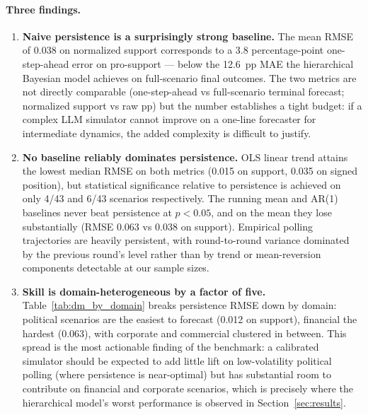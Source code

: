 \documentclass[12pt]{article}
\begin{document}
\paragraph{Three findings.}
\begin{enumerate}
    \item \textbf{Naive persistence is a surprisingly strong baseline.} The mean RMSE of 0.038 on normalized support corresponds to a 3.8 percentage-point one-step-ahead error on pro-support --- below the 12.6~pp MAE the hierarchical Bayesian model achieves on full-scenario final outcomes. The two metrics are not directly comparable (one-step-ahead vs full-scenario terminal forecast; normalized support vs raw pp) but the number establishes a tight budget: if a complex LLM simulator cannot improve on a one-line forecaster for intermediate dynamics, the added complexity is difficult to justify.

    \item \textbf{No baseline reliably dominates persistence.} OLS linear trend attains the lowest median RMSE on both metrics (0.015 on support, 0.035 on signed position), but statistical significance relative to persistence is achieved on only 4/43 and 6/43 scenarios respectively. The running mean and AR(1) baselines never beat persistence at $p < 0.05$, and on the mean they lose substantially (RMSE 0.063 vs 0.038 on support). Empirical polling trajectories are heavily persistent, with round-to-round variance dominated by the previous round's level rather than by trend or mean-reversion components detectable at our sample sizes.

    \item \textbf{Skill is domain-heterogeneous by a factor of five.} Table~\ref{tab:dm_by_domain} breaks persistence RMSE down by domain: political scenarios are the easiest to forecast (0.012 on support), financial the hardest (0.063), with corporate and commercial clustered in between. This spread is the most actionable finding of the benchmark: a calibrated simulator should be expected to add little lift on low-volatility political polling (where persistence is near-optimal) but has substantial room to contribute on financial and corporate scenarios, which is precisely where the hierarchical model's worst performance is observed in Section~\ref{sec:results}.
\end{enumerate}
\end{document}
